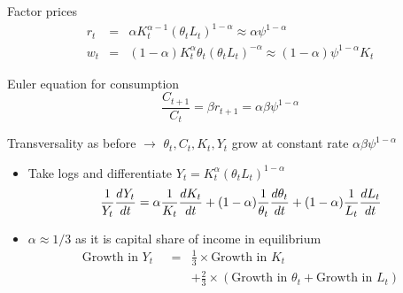 \documentclass[notes=show]{beamer}
\begin{document}
\begin{frame}%


Factor prices%
\begin{eqnarray*}
r_{t} &=&\alpha K_{t}^{\alpha -1}\left( \theta _{t}L_{t}\right) ^{1-\alpha
}\approx \alpha \psi ^{1-\alpha } \\
w_{t} &=&\left( 1-\alpha \right) K_{t}^{\alpha }\theta _{t}\left( \theta
_{t}L_{t}\right) ^{-\alpha }\approx \left( 1-\alpha \right) \psi ^{1-\alpha
}K_{t}
\end{eqnarray*}

Euler equation for consumption%
\begin{equation*}
\frac{C_{t+1}}{C_{t}}=\beta r_{t+1}=\alpha \beta \psi ^{1-\alpha }
\end{equation*}

Transversality as before $\rightarrow $ $\theta _{t},C_{t},K_{t},Y_{t}$ grow
at constant rate $\alpha \beta \psi ^{1-\alpha }$

\transboxout%
\end{frame}%

\begin{frame}%


\begin{itemize}
\item Take logs and differentiate $Y_{t}=K_{t}^{\alpha }\left( \theta
_{t}L_{t}\right) ^{1-\alpha }$%
\begin{equation*}
\frac{1}{Y_{t}}\frac{dY_{t}}{dt}=\alpha \frac{1}{K_{t}}\frac{dK_{t}}{dt}%
+(1-\alpha )\frac{1}{\theta _{t}}\frac{d\theta _{t}}{dt}+(1-\alpha )\frac{1}{%
L_{t}}\frac{dL_{t}}{dt}
\end{equation*}

\item $\alpha \approx 1/3$ as it is capital share of income in equilibrium%
\begin{eqnarray*}
\text{Growth in }Y_{t}\text{ } &=&\frac{1}{3}\times \text{Growth in }K_{t} \\
&&+\frac{2}{3}\times \left( \text{Growth in }\theta _{t}+\text{Growth in }%
L_{t}\right)
\end{eqnarray*}
\end{itemize}

\transboxout%
\end{frame}%
\end{document}

